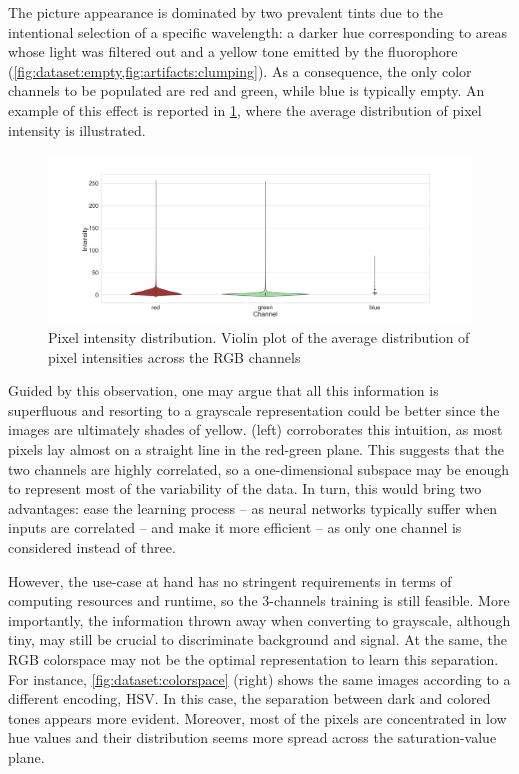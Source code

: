 The picture appearance is dominated by two prevalent tints due to the intentional selection of a specific wavelength: a darker hue corresponding to areas whose light was filtered out and a yellow tone emitted by the fluorophore
(\cref{fig:dataset:empty,fig:artifacts:clumping}).
As a consequence, the only color channels to be populated are red and green, while blue is typically empty. 
An example of this effect is reported in \cref{fig:dataset:pixel_intensity}, where the average distribution of pixel intensity is illustrated.
\begin{figure}
    \centering
    \includegraphics[width=\textwidth]{figures/120_dataset/pixel_intensity_distribution.png}
    \caption{Pixel intensity distribution. Violin plot of the average distribution of pixel intensities across the  RGB channels}
    \label{fig:dataset:pixel_intensity}
\end{figure}
Guided by this observation, one may argue that all this information is superfluous and resorting to a grayscale representation could be better since the images are ultimately shades of yellow.
 (left) corroborates this intuition, as most pixels lay almost on a straight line in the red-green plane. 
This suggests that the two channels are highly correlated, so a one-dimensional subspace may be enough to represent most of the variability of the data.
In turn, this would bring two advantages: ease the learning process -- as neural networks typically suffer when inputs are correlated %
-- and make it more efficient -- as only one channel is considered instead of three.

However, the use-case at hand has no stringent requirements in terms of computing resources and runtime, so the 3-channels training is still feasible.
More importantly, the information thrown away when converting to grayscale, although tiny, may still be crucial to discriminate background and signal. 
At the same, the RGB colorspace may not be the optimal representation to learn this separation. For instance, \cref{fig:dataset:colorspace} (right) shows the same images according to a different encoding, HSV. 
In this case, the separation between dark and colored tones appears more evident. 
Moreover, most of the pixels are concentrated in low hue values
and their distribution seems more spread across the saturation-value plane. 

